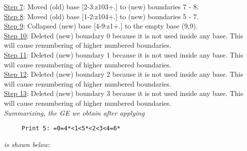 \documentclass[final]{article}
\begin{document}
{\underline{Step 7}:} Moved (old) base [2-3:z103+.]  to (new) boundaries 7 - 8.\\
{\underline{Step 8}:} Moved (old) base [1-2:z104+.]  to (new) boundaries 5 - 7.\\
{\underline{Step 9}:} Collapsed (new) base [4-9:z1+.]  to the empty base (9,9).
\\
{\underline{Step 10}:} Deleted (new) boundary 0 because it is not used inside any base.  This will cause renumbering of higher numbered boundaries.
\\
{\underline{Step 11}:} Deleted (new) boundary 1 because it is not used inside any base.  This will cause renumbering of higher numbered boundaries.
\\
{\underline{Step 12}:} Deleted (new) boundary 2 because it is not used inside any base.  This will cause renumbering of higher numbered boundaries.
\\
{\underline{Step 13}:} Deleted (new) boundary 3 because it is not used inside any base.  This will cause renumbering of higher numbered boundaries.
\\[0.1in]
{\em Summarizing, the GE we obtain after applying}
\begin{verbatim}
     Print 5: =0=4*<1<5*<2<3<4=6*
\end{verbatim}
{\em is shown below:}
\end{document}
